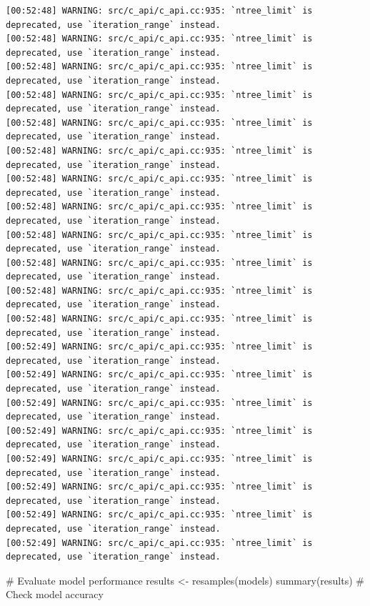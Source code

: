\documentclass[
  letterpaper,
  DIV=11,
  numbers=noendperiod]{scrartcl}
\newenvironment{Shaded}{\begin{snugshade}}{\end{snugshade}}
\newcommand{\CommentTok}[1]{\textcolor[rgb]{0.37,0.37,0.37}{#1}}
\newcommand{\FunctionTok}[1]{\textcolor[rgb]{0.28,0.35,0.67}{#1}}
\newcommand{\NormalTok}[1]{\textcolor[rgb]{0.00,0.23,0.31}{#1}}
\newcommand{\OtherTok}[1]{\textcolor[rgb]{0.00,0.23,0.31}{#1}}
\begin{document}
\begin{verbatim}
[00:52:48] WARNING: src/c_api/c_api.cc:935: `ntree_limit` is deprecated, use `iteration_range` instead.
[00:52:48] WARNING: src/c_api/c_api.cc:935: `ntree_limit` is deprecated, use `iteration_range` instead.
[00:52:48] WARNING: src/c_api/c_api.cc:935: `ntree_limit` is deprecated, use `iteration_range` instead.
[00:52:48] WARNING: src/c_api/c_api.cc:935: `ntree_limit` is deprecated, use `iteration_range` instead.
[00:52:48] WARNING: src/c_api/c_api.cc:935: `ntree_limit` is deprecated, use `iteration_range` instead.
[00:52:48] WARNING: src/c_api/c_api.cc:935: `ntree_limit` is deprecated, use `iteration_range` instead.
[00:52:48] WARNING: src/c_api/c_api.cc:935: `ntree_limit` is deprecated, use `iteration_range` instead.
[00:52:48] WARNING: src/c_api/c_api.cc:935: `ntree_limit` is deprecated, use `iteration_range` instead.
[00:52:48] WARNING: src/c_api/c_api.cc:935: `ntree_limit` is deprecated, use `iteration_range` instead.
[00:52:48] WARNING: src/c_api/c_api.cc:935: `ntree_limit` is deprecated, use `iteration_range` instead.
[00:52:48] WARNING: src/c_api/c_api.cc:935: `ntree_limit` is deprecated, use `iteration_range` instead.
[00:52:48] WARNING: src/c_api/c_api.cc:935: `ntree_limit` is deprecated, use `iteration_range` instead.
[00:52:49] WARNING: src/c_api/c_api.cc:935: `ntree_limit` is deprecated, use `iteration_range` instead.
[00:52:49] WARNING: src/c_api/c_api.cc:935: `ntree_limit` is deprecated, use `iteration_range` instead.
[00:52:49] WARNING: src/c_api/c_api.cc:935: `ntree_limit` is deprecated, use `iteration_range` instead.
[00:52:49] WARNING: src/c_api/c_api.cc:935: `ntree_limit` is deprecated, use `iteration_range` instead.
[00:52:49] WARNING: src/c_api/c_api.cc:935: `ntree_limit` is deprecated, use `iteration_range` instead.
[00:52:49] WARNING: src/c_api/c_api.cc:935: `ntree_limit` is deprecated, use `iteration_range` instead.
[00:52:49] WARNING: src/c_api/c_api.cc:935: `ntree_limit` is deprecated, use `iteration_range` instead.
[00:52:49] WARNING: src/c_api/c_api.cc:935: `ntree_limit` is deprecated, use `iteration_range` instead.
\end{verbatim}

\begin{Shaded}
\begin{Highlighting}[]
\CommentTok{\# Evaluate model performance}
\NormalTok{results }\OtherTok{\textless{}{-}} \FunctionTok{resamples}\NormalTok{(models)}
\FunctionTok{summary}\NormalTok{(results)  }\CommentTok{\# Check model accuracy}
\end{Highlighting}
\end{Shaded}
\end{document}
